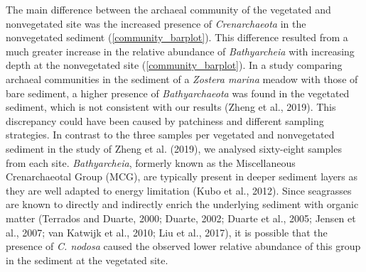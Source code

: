 \documentclass[12pt,]{article}
\begin{document}
The main difference between the archaeal community of the vegetated and
nonvegetated site was the increased presence of \emph{Crenarchaeota} in
the nonvegetated sediment (\autoref {community_barplot}). This
difference resulted from a much greater increase in the relative
abundance of \emph{Bathyarcheia} with increasing depth at the
nonvegetated site (\autoref {community_barplot}). In a study comparing
archaeal communities in the sediment of a \emph{Zostera marina} meadow
with those of bare sediment, a higher presence of \emph{Bathyarchaeota}
was found in the vegetated sediment, which is not consistent with our
results (Zheng et al., 2019). This discrepancy could have been caused by
patchiness and different sampling strategies. In contrast to the three
samples per vegetated and nonvegetated sediment in the study of Zheng et
al. (2019), we analysed sixty-eight samples from each site.
\emph{Bathyarcheia}, formerly known as the Miscellaneous Crenarchaeotal
Group (MCG), are typically present in deeper sediment layers as they are
well adapted to energy limitation (Kubo et al., 2012). Since seagrasses
are known to directly and indirectly enrich the underlying sediment with
organic matter (Terrados and Duarte, 2000; Duarte, 2002; Duarte et al.,
2005; Jensen et al., 2007; van Katwijk et al., 2010; Liu et al., 2017),
it is possible that the presence of \emph{C. nodosa} caused the observed
lower relative abundance of this group in the sediment at the vegetated
site.
\end{document}

